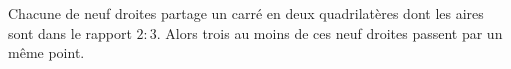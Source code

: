 Chacune de neuf droites partage un carré en deux quadrilatères dont les aires sont dans le rapport $2 : 3$. Alors trois au moins de ces neuf droites passent par un même point.
